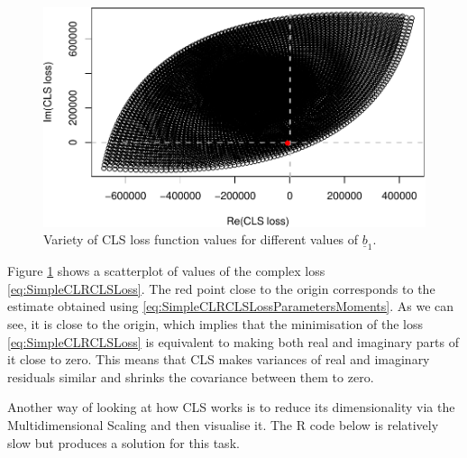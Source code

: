 \documentclass[
]{book}
\begin{document}
\begin{figure}
\centering
\includegraphics{Svetunkov---Svetunkov---Complex-Valued-Econometrics_files/figure-latex/clsScatter-1.pdf}
\caption{\label{fig:clsScatter}Variety of CLS loss function values for different values of \(\underline{b}_1\).}
\end{figure}

Figure \ref{fig:clsScatter} shows a scatterplot of values of the complex loss \eqref{eq:SimpleCLRCLSLoss}. The red point close to the origin corresponds to the estimate obtained using \eqref{eq:SimpleCLRCLSLossParametersMoments}. As we can see, it is close to the origin, which implies that the minimisation of the loss \eqref{eq:SimpleCLRCLSLoss} is equivalent to making both real and imaginary parts of it close to zero. This means that CLS makes variances of real and imaginary residuals similar and shrinks the covariance between them to zero.

Another way of looking at how CLS works is to reduce its dimensionality via the Multidimensional Scaling \citep[see, for example,][]{Borg2005} and then visualise it. The R code below is relatively slow but produces a solution for this task.
\end{document}
